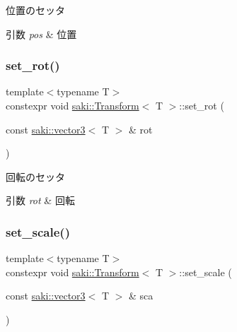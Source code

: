 位置のセッタ 


\begin{DoxyParams}{引数}
{\em pos} & 位置 \\
\hline
\end{DoxyParams}
\mbox{\label{classsaki_1_1_transform_a8678bfb9e2e9041848fa41ebe6bc7be3}} 
\subsubsection{\texorpdfstring{set\+\_\+rot()}{set\_rot()}}
{\footnotesize\ttfamily template$<$typename T$>$ \\
constexpr void \mbox{\hyperlink{classsaki_1_1_transform}{saki\+::\+Transform}}$<$ T $>$\+::set\+\_\+rot (\begin{DoxyParamCaption}\item[{const \mbox{\hyperlink{classsaki_1_1vector3}{saki\+::vector3}}$<$ T $>$ \&}]{rot }\end{DoxyParamCaption})\hspace{0.3cm}{\ttfamily [inline]}}



回転のセッタ 


\begin{DoxyParams}{引数}
{\em rot} & 回転 \\
\hline
\end{DoxyParams}
\mbox{\label{classsaki_1_1_transform_af6bda82cb33bd6b5ece0dc11db6a7c1e}} 
\subsubsection{\texorpdfstring{set\+\_\+scale()}{set\_scale()}}
{\footnotesize\ttfamily template$<$typename T$>$ \\
constexpr void \mbox{\hyperlink{classsaki_1_1_transform}{saki\+::\+Transform}}$<$ T $>$\+::set\+\_\+scale (\begin{DoxyParamCaption}\item[{const \mbox{\hyperlink{classsaki_1_1vector3}{saki\+::vector3}}$<$ T $>$ \&}]{sca }\end{DoxyParamCaption})\hspace{0.3cm}{\ttfamily [inline]}}



